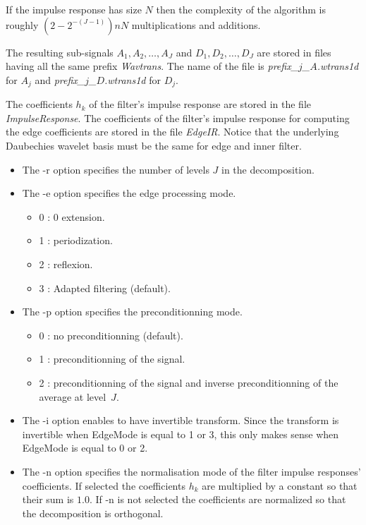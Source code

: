 If the impulse response has size \( N \) then the complexity of the algorithm is roughly \( (2 - 2^{-(J-1)})nN \) multiplications and additions. 

The resulting sub-signals \( A_{1}, A_{2}, \ldots, A_{J} \) and \( D_{1}, D_{2}, \ldots, D_{J} \) are stored in files having all the same prefix {\em Wavtrans}. The name of the file is {\em prefix\_$j$\_$A$.wtrans1d} for \( A_{j} \) and {\em prefix\_$j$\_$D$.wtrans1d} for \( D_{j} \).

The coefficients \( h_{k} \) of the filter's impulse response are stored in the file {\em ImpulseResponse}. The coefficients of the filter's impulse response for computing the edge coefficients are stored in the file {\em EdgeIR}. Notice that the underlying Daubechies wavelet basis must be the same for edge and inner filter. 

\begin{itemize}
\item
The -r option specifies the number of levels $J$ in the decomposition.
\item
The -e option specifies the edge processing mode.
\begin{itemize}
\item
0 : 0 extension.
\item
1 : periodization.
\item
2 : reflexion.
\item
3 : Adapted filtering (default).
\end{itemize}
\item
The -p option specifies the preconditionning mode.
\begin{itemize}
\item
0 : no preconditionning (default).
\item
1 : preconditionning of the signal.
\item
2 : preconditionning of the signal and inverse preconditionning of the average at level~$J$.
\end{itemize}
\item
The -i option enables to have invertible transform. Since the transform is invertible when EdgeMode is equal to 1 or 3, this only makes sense when EdgeMode is equal to 0 or 2. 
\item
The -n option specifies the normalisation mode of the filter impulse responses' coefficients. If selected the coefficients $h_{k}$ are multiplied by a constant so that their sum is $1.0$. If -n is not selected the coefficients are normalized so that the decomposition is orthogonal. 
\end{itemize}

